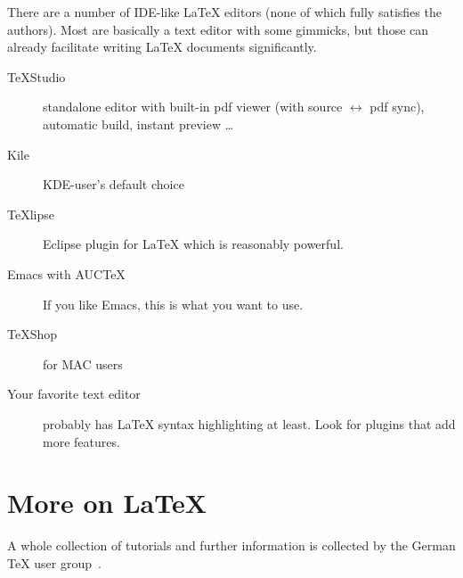 \documentclass[]{rptuseminar}
\begin{document}
There are a number of IDE-like \LaTeX{} editors (none of which fully satisfies the authors).
Most are basically a text editor with some gimmicks, but those can already facilitate writing \LaTeX{} documents significantly.
\begin{description}
	\item[TeXStudio] standalone editor with built-in pdf viewer
	(with source $\leftrightarrow$ pdf sync), automatic build, instant preview \dots
	\item[Kile] KDE-user's default choice
	\item[TeXlipse] Eclipse plugin for \LaTeX{} which is reasonably powerful.
	\item[Emacs with AUCTeX] If you like Emacs, this is what you want to use.
	\item[TeXShop] for MAC users
	\item[Your favorite text editor] probably has \LaTeX{} syntax highlighting at least.
	  Look for plugins that add more features.
\end{description}

\section{More on \LaTeX}
A whole collection of tutorials and further information is collected by the German \TeX{} user group~\cite{danteintro}.
\end{document}
